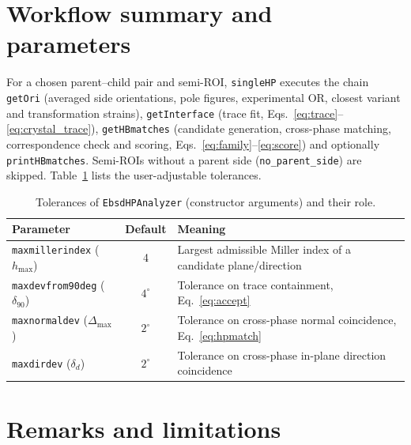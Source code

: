 \documentclass[11pt,a4paper]{article}
\begin{document}
\section{Workflow summary and parameters}

For a chosen parent--child pair and semi-ROI, \texttt{singleHP} executes the chain \texttt{getOri} (averaged side orientations, pole figures, experimental OR, closest variant and transformation strains), \texttt{getInterface} (trace fit, Eqs.~\eqref{eq:trace}--\eqref{eq:crystal_trace}), \texttt{getHBmatches} (candidate generation, cross-phase matching, correspondence check and scoring, Eqs.~\eqref{eq:family}--\eqref{eq:score}) and optionally \texttt{printHBmatches}. Semi-ROIs without a parent side (\texttt{no\_parent\_side}) are skipped. Table~\ref{tab:params} lists the user-adjustable tolerances.

\begin{table}[ht]
\centering
\caption{Tolerances of \texttt{EbsdHPAnalyzer} (constructor arguments) and their role.}
\label{tab:params}
\begin{tabular}{lcl}
\toprule
Parameter & Default & Meaning \\
\midrule
\texttt{maxmillerindex} ($h_{\max}$) & 4 & Largest admissible Miller index of a candidate plane/direction \\
\texttt{maxdevfrom90deg} ($\delta_{90}$) & $4^\circ$ & Tolerance on trace containment, Eq.~\eqref{eq:accept} \\
\texttt{maxnormaldev} ($\Delta_{\max}$) & $2^\circ$ & Tolerance on cross-phase normal coincidence, Eq.~\eqref{eq:hpmatch} \\
\texttt{maxdirdev} ($\delta_d$) & $2^\circ$ & Tolerance on cross-phase in-plane direction coincidence \\
\bottomrule
\end{tabular}
\end{table}

\section{Remarks and limitations}
\end{document}
